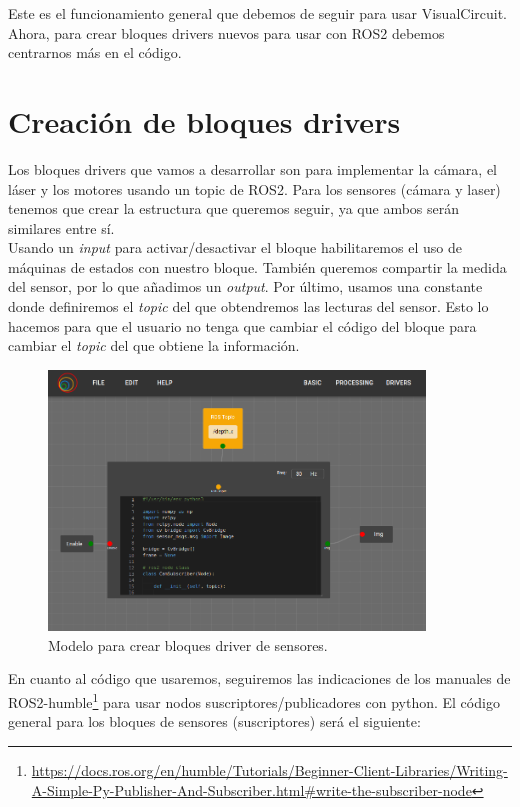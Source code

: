 Este es el funcionamiento general que debemos de seguir para usar VisualCircuit. Ahora, para crear bloques drivers nuevos para usar con ROS2 debemos centrarnos más en el código.

\section{Creación de bloques drivers}
\label{sec:drivers_creacion}

Los bloques drivers que vamos a desarrollar son para implementar la cámara, el láser y los motores usando un topic de ROS2. Para los sensores (cámara y laser) tenemos que crear la estructura que queremos seguir, ya que ambos serán similares entre sí.\\

Usando un \textit{input} para activar/desactivar el bloque habilitaremos el uso de máquinas de estados con nuestro bloque. También queremos compartir la medida del sensor, por lo que añadimos un \textit{output}. Por último, usamos una constante donde definiremos el \textit{topic} del que obtendremos las lecturas del sensor. Esto lo hacemos para que el usuario no tenga que cambiar el código del bloque para cambiar el \textit{topic} del que obtiene la información.\\
\begin{figure} [H]
  \begin{center}
      \includegraphics[width=10cm]{figs/c4/VC_driver_blocks.png}
  \end{center}
  \caption[Modelo bloque driver sensores]{Modelo para crear bloques driver de sensores.}
  \label{fig:VC_driver_model}
\end{figure}

En cuanto al código que usaremos, seguiremos las indicaciones de los manuales de ROS2-humble\footnote{\url{https://docs.ros.org/en/humble/Tutorials/Beginner-Client-Libraries/Writing-A-Simple-Py-Publisher-And-Subscriber.html\#write-the-subscriber-node}} para usar nodos suscriptores/publicadores con python. El código general para los bloques de sensores (suscriptores) será el siguiente:

